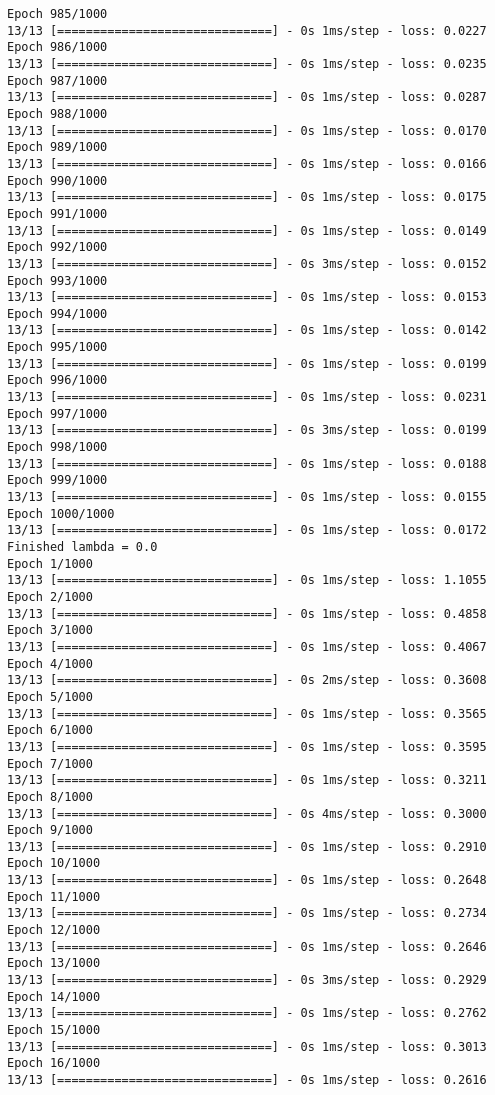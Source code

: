 \documentclass[11pt]{article}
\begin{document}
\begin{Verbatim}[commandchars=\\\{\}]
Epoch 985/1000
13/13 [==============================] - 0s 1ms/step - loss: 0.0227
Epoch 986/1000
13/13 [==============================] - 0s 1ms/step - loss: 0.0235
Epoch 987/1000
13/13 [==============================] - 0s 1ms/step - loss: 0.0287
Epoch 988/1000
13/13 [==============================] - 0s 1ms/step - loss: 0.0170
Epoch 989/1000
13/13 [==============================] - 0s 1ms/step - loss: 0.0166
Epoch 990/1000
13/13 [==============================] - 0s 1ms/step - loss: 0.0175
Epoch 991/1000
13/13 [==============================] - 0s 1ms/step - loss: 0.0149
Epoch 992/1000
13/13 [==============================] - 0s 3ms/step - loss: 0.0152
Epoch 993/1000
13/13 [==============================] - 0s 1ms/step - loss: 0.0153
Epoch 994/1000
13/13 [==============================] - 0s 1ms/step - loss: 0.0142
Epoch 995/1000
13/13 [==============================] - 0s 1ms/step - loss: 0.0199
Epoch 996/1000
13/13 [==============================] - 0s 1ms/step - loss: 0.0231
Epoch 997/1000
13/13 [==============================] - 0s 3ms/step - loss: 0.0199
Epoch 998/1000
13/13 [==============================] - 0s 1ms/step - loss: 0.0188
Epoch 999/1000
13/13 [==============================] - 0s 1ms/step - loss: 0.0155
Epoch 1000/1000
13/13 [==============================] - 0s 1ms/step - loss: 0.0172
Finished lambda = 0.0
Epoch 1/1000
13/13 [==============================] - 0s 1ms/step - loss: 1.1055
Epoch 2/1000
13/13 [==============================] - 0s 1ms/step - loss: 0.4858
Epoch 3/1000
13/13 [==============================] - 0s 1ms/step - loss: 0.4067
Epoch 4/1000
13/13 [==============================] - 0s 2ms/step - loss: 0.3608
Epoch 5/1000
13/13 [==============================] - 0s 1ms/step - loss: 0.3565
Epoch 6/1000
13/13 [==============================] - 0s 1ms/step - loss: 0.3595
Epoch 7/1000
13/13 [==============================] - 0s 1ms/step - loss: 0.3211
Epoch 8/1000
13/13 [==============================] - 0s 4ms/step - loss: 0.3000
Epoch 9/1000
13/13 [==============================] - 0s 1ms/step - loss: 0.2910
Epoch 10/1000
13/13 [==============================] - 0s 1ms/step - loss: 0.2648
Epoch 11/1000
13/13 [==============================] - 0s 1ms/step - loss: 0.2734
Epoch 12/1000
13/13 [==============================] - 0s 1ms/step - loss: 0.2646
Epoch 13/1000
13/13 [==============================] - 0s 3ms/step - loss: 0.2929
Epoch 14/1000
13/13 [==============================] - 0s 1ms/step - loss: 0.2762
Epoch 15/1000
13/13 [==============================] - 0s 1ms/step - loss: 0.3013
Epoch 16/1000
13/13 [==============================] - 0s 1ms/step - loss: 0.2616

\end{Verbatim}
\end{document}
